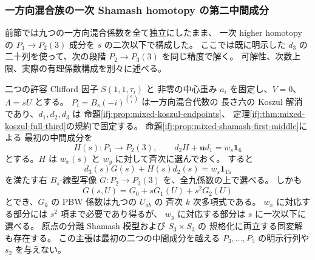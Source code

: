 \subsubsection{一方向混合族の一次 Shamash homotopy の第二中間成分}
\label{ifj:subsubsec:mixed-shamash-second-middle}

前節では九つの一方向混合係数を全て独立にしたまま、
一次 higher homotopy の $P_1\to P_2(3)$ 成分を
$s$ の二次以下で構成した。
ここでは既に明示した $d_3$ の二十列を使って、次の段階
$P_2\to P_3(3)$ を同じ精度で解く。
可解性、次数上限、実際の有理係数構成を別々に述べる。

\begin{proposition}[九変数一方向族における第二中間成分の存在と二次次数上限]
\label{ifj:prop:mixed-shamash-second-middle}
二つの許容 Clifford 因子 $S(1,1,\tau_i)$ と
非零の中心重み $a_i$ を固定し、$V=0$、$\Lambda=sU$ とする。
$P_i=B_s(-i)^{\binom6i}$ は一方向混合代数の
長さ六の Koszul 解消であり、$d_1,d_2,d_3$ は
命題\ref{ifj:prop:mixed-koszul-endpoints}、
定理\ref{ifj:thm:mixed-koszul-full-third}の規約で固定する。
命題\ref{ifj:prop:mixed-shamash-first-middle}による
最初の中間成分を
\[
 H(s):P_1\longrightarrow P_2(3),\qquad
 d_2H+\mathbf u d_1=w_s\mathbf1_6
\]
とする。$H$ は $w_x(s)$ と $w_y$ に対して斉次に選んでおく。
すると
\begin{equation}\label{ifj:eq:mixed-shamash-second-equation}
 \boxed{\quad d_3(s)G(s)+H(s)d_2(s)=w_s\mathbf1_{15}\quad}
\end{equation}
を満たす右 $B_s$-線型写像
$G:P_2\to P_3(3)$ を、全九係数の上で選べる。
しかも
\begin{equation}\label{ifj:eq:mixed-shamash-second-quadratic}
 G(s,U)=G_0+sG_1(U)+s^2G_2(U)
\end{equation}
とでき、$G_k$ の PBW 係数は九つの $U_{ab}$ の
斉次 $k$ 次多項式である。
$w_x$ に対応する部分には $s^2$ 項まで必要であり得るが、
$w_y$ に対応する部分は $s$ に一次以下に選べる。
原点の分離 Shamash 模型および $S_3\times S_3$ の
規格化に両立する同変解も存在する。
この主張は最初の二つの中間成分を越える
$P_3,\ldots,P_5$ の明示行列や $s_2$ を与えない。
\end{proposition}

